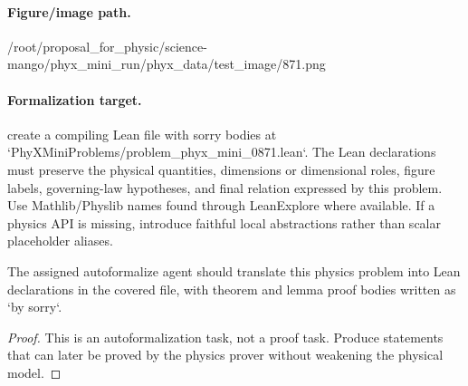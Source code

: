 \paragraph{Figure/image path.}
/root/proposal\_for\_physic/science-mango/phyx\_mini\_run/phyx\_data/test\_image/871.png

\paragraph{Formalization target.}
create a compiling Lean file with sorry bodies at `PhyXMiniProblems/problem\_phyx\_mini\_0871.lean`. The Lean declarations must preserve the physical quantities, dimensions or dimensional roles, figure labels, governing-law hypotheses, and final relation expressed by this problem.
Use Mathlib/Physlib names found through LeanExplore where available. If a physics API is missing, introduce faithful local abstractions rather than scalar placeholder aliases.

\begin{theorem}
\label{thm:physics:phyx_mini_0871:target}
The assigned autoformalize agent should translate this physics problem into Lean declarations in the covered file, with theorem and lemma proof bodies written as `by sorry`.
\end{theorem}
\begin{proof}
This is an autoformalization task, not a proof task. Produce statements that can later be proved by the physics prover without weakening the physical model.
\end{proof}

